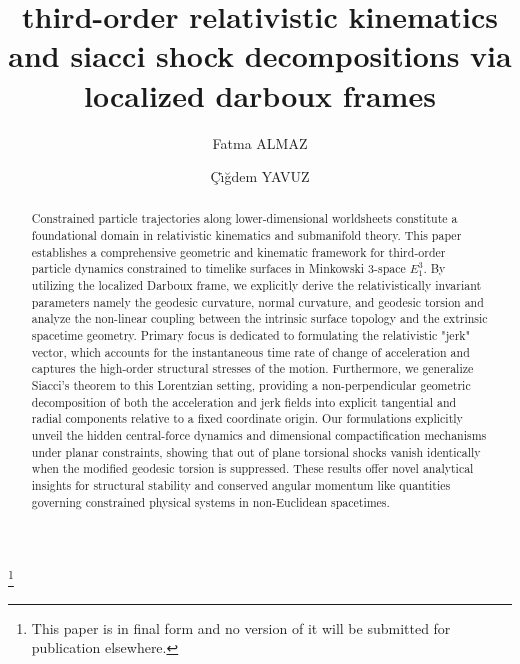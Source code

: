 \documentclass[reqno]{amsart}
\theoremstyle{plain}
\numberwithin{equation}{section}
\begin{document}
\title[Batman University]{third-order relativistic kinematics and siacci shock decompositions via localized darboux frames}
\author{Fatma ALMAZ}
\address{department of mathematics, faculty of arts and sciences, batman
university, batman/ t\"{u}rk\.{ı}ye orcid: 0000-0002-1060-7813}
\author{\c{C}\.{ı}\u{g}dem YAVUZ}
\address{department of mathematics, faculty of arts and sciences, batman
university, batman/ t\"{u}rk\.{ı}ye, orcid: 0009-0002-7030-4205}
\thanks{This paper is in final form and no version of it will be submitted
for publication elsewhere.}

\begin{abstract}
Constrained particle trajectories along lower-dimensional worldsheets constitute a foundational domain in relativistic kinematics and submanifold theory. This paper establishes a comprehensive geometric and kinematic framework for third-order particle dynamics constrained to timelike surfaces in Minkowski 3-space $E_1^3$. By utilizing the localized Darboux frame, we explicitly derive the relativistically invariant parameters namely the geodesic curvature, normal curvature, and geodesic torsion and analyze the non-linear coupling between the intrinsic surface topology and the extrinsic spacetime geometry. Primary focus is dedicated to formulating the relativistic "jerk" vector, which accounts for the instantaneous time rate of change of acceleration and captures the high-order structural stresses of the motion. Furthermore, we generalize Siacci's theorem to this Lorentzian setting, providing a non-perpendicular geometric decomposition of both the acceleration and jerk fields into explicit tangential and radial components relative to a fixed coordinate origin. Our formulations explicitly unveil the hidden central-force dynamics and dimensional compactification mechanisms under planar constraints, showing that out of plane torsional shocks vanish identically when the modified geodesic torsion is suppressed. These results offer novel analytical insights for structural stability and conserved angular momentum like quantities governing constrained physical systems in non-Euclidean spacetimes.


\end{abstract}

\maketitle
\end{document}
